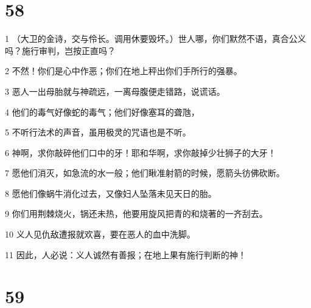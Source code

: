 \chapter{58}

\par 1 （大卫的金诗，交与伶长。调用休要毁坏。）世人哪，你们默然不语，真合公义吗？施行审判，岂按正直吗？
\par 2 不然！你们是心中作恶；你们在地上秤出你们手所行的强暴。
\par 3 恶人一出母胎就与神疏远，一离母腹便走错路，说谎话。
\par 4 他们的毒气好像蛇的毒气；他们好像塞耳的聋虺，
\par 5 不听行法术的声音，虽用极灵的咒语也是不听。
\par 6 神啊，求你敲碎他们口中的牙！耶和华啊，求你敲掉少壮狮子的大牙！
\par 7 愿他们消灭，如急流的水一般；他们瞅准射箭的时候，愿箭头彷佛砍断。
\par 8 愿他们像蜗牛消化过去，又像妇人坠落未见天日的胎。
\par 9 你们用荆棘烧火，锅还未热，他要用旋风把青的和烧著的一齐刮去。
\par 10 义人见仇敌遭报就欢喜，要在恶人的血中洗脚。
\par 11 因此，人必说：义人诚然有善报；在地上果有施行判断的神！

\chapter{59}

